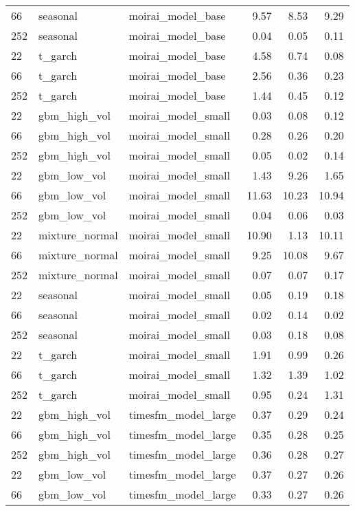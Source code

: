 {\begin{tabular}{lllrrr}
66 & seasonal & moirai\_model\_base & 9.57 & 8.53 & 9.29 \\
252 & seasonal & moirai\_model\_base & 0.04 & 0.05 & 0.11 \\
\midrule
22 & t\_garch & moirai\_model\_base & 4.58 & 0.74 & 0.08 \\
66 & t\_garch & moirai\_model\_base & 2.56 & 0.36 & 0.23 \\
252 & t\_garch & moirai\_model\_base & 1.44 & 0.45 & 0.12 \\
\midrule
22 & gbm\_high\_vol & moirai\_model\_small & 0.03 & 0.08 & 0.12 \\
66 & gbm\_high\_vol & moirai\_model\_small & 0.28 & 0.26 & 0.20 \\
252 & gbm\_high\_vol & moirai\_model\_small & 0.05 & 0.02 & 0.14 \\
\midrule
22 & gbm\_low\_vol & moirai\_model\_small & 1.43 & 9.26 & 1.65 \\
66 & gbm\_low\_vol & moirai\_model\_small & 11.63 & 10.23 & 10.94 \\
252 & gbm\_low\_vol & moirai\_model\_small & 0.04 & 0.06 & 0.03 \\
\midrule
22 & mixture\_normal & moirai\_model\_small & 10.90 & 1.13 & 10.11 \\
66 & mixture\_normal & moirai\_model\_small & 9.25 & 10.08 & 9.67 \\
252 & mixture\_normal & moirai\_model\_small & 0.07 & 0.07 & 0.17 \\
\midrule
22 & seasonal & moirai\_model\_small & 0.05 & 0.19 & 0.18 \\
66 & seasonal & moirai\_model\_small & 0.02 & 0.14 & 0.02 \\
252 & seasonal & moirai\_model\_small & 0.03 & 0.18 & 0.08 \\
\midrule
22 & t\_garch & moirai\_model\_small & 1.91 & 0.99 & 0.26 \\
66 & t\_garch & moirai\_model\_small & 1.32 & 1.39 & 1.02 \\
252 & t\_garch & moirai\_model\_small & 0.95 & 0.24 & 1.31 \\
\midrule
22 & gbm\_high\_vol & timesfm\_model\_large & 0.37 & 0.29 & 0.24 \\
66 & gbm\_high\_vol & timesfm\_model\_large & 0.35 & 0.28 & 0.25 \\
252 & gbm\_high\_vol & timesfm\_model\_large & 0.36 & 0.28 & 0.27 \\
\midrule
22 & gbm\_low\_vol & timesfm\_model\_large & 0.37 & 0.27 & 0.26 \\
66 & gbm\_low\_vol & timesfm\_model\_large & 0.33 & 0.27 & 0.26 \\

\end{tabular}}
